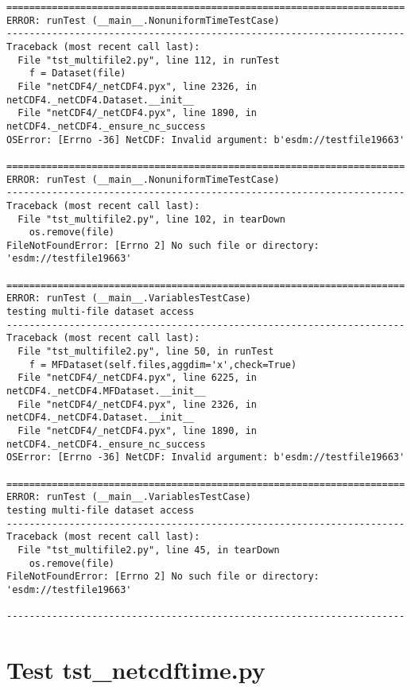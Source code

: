\begin{verbatim}
======================================================================
ERROR: runTest (__main__.NonuniformTimeTestCase)
----------------------------------------------------------------------
Traceback (most recent call last):
  File "tst_multifile2.py", line 112, in runTest
    f = Dataset(file)
  File "netCDF4/_netCDF4.pyx", line 2326, in netCDF4._netCDF4.Dataset.__init__
  File "netCDF4/_netCDF4.pyx", line 1890, in netCDF4._netCDF4._ensure_nc_success
OSError: [Errno -36] NetCDF: Invalid argument: b'esdm://testfile19663'

======================================================================
ERROR: runTest (__main__.NonuniformTimeTestCase)
----------------------------------------------------------------------
Traceback (most recent call last):
  File "tst_multifile2.py", line 102, in tearDown
    os.remove(file)
FileNotFoundError: [Errno 2] No such file or directory: 'esdm://testfile19663'

======================================================================
ERROR: runTest (__main__.VariablesTestCase)
testing multi-file dataset access
----------------------------------------------------------------------
Traceback (most recent call last):
  File "tst_multifile2.py", line 50, in runTest
    f = MFDataset(self.files,aggdim='x',check=True)
  File "netCDF4/_netCDF4.pyx", line 6225, in netCDF4._netCDF4.MFDataset.__init__
  File "netCDF4/_netCDF4.pyx", line 2326, in netCDF4._netCDF4.Dataset.__init__
  File "netCDF4/_netCDF4.pyx", line 1890, in netCDF4._netCDF4._ensure_nc_success
OSError: [Errno -36] NetCDF: Invalid argument: b'esdm://testfile19663'

======================================================================
ERROR: runTest (__main__.VariablesTestCase)
testing multi-file dataset access
----------------------------------------------------------------------
Traceback (most recent call last):
  File "tst_multifile2.py", line 45, in tearDown
    os.remove(file)
FileNotFoundError: [Errno 2] No such file or directory: 'esdm://testfile19663'

----------------------------------------------------------------------
\end{verbatim}

\section{Test tst\_netcdftime.py}

